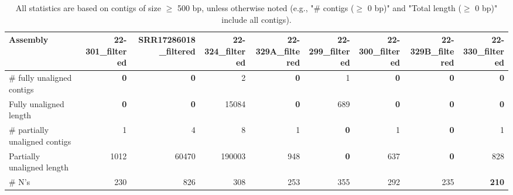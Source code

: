 \documentclass[12pt,a4paper]{article}
\begin{document}
\begin{table}[ht]
\begin{center}
\caption{All statistics are based on contigs of size $\geq$ 500 bp, unless otherwise noted (e.g., "\# contigs ($\geq$ 0 bp)" and "Total length ($\geq$ 0 bp)" include all contigs).}
\begin{tabular}{|l*{8}{|r}|}
\hline
Assembly & 22-301\_filtered & SRR17286018\_filtered & 22-324\_filtered & 22-329A\_filtered & 22-299\_filtered & 22-300\_filtered & 22-329B\_filtered & 22-330\_filtered \\ \hline
\# fully unaligned contigs & {\bf 0} & {\bf 0} & 2 & {\bf 0} & 1 & {\bf 0} & {\bf 0} & {\bf 0} \\ \hline
Fully unaligned length & {\bf 0} & {\bf 0} & 15084 & {\bf 0} & 689 & {\bf 0} & {\bf 0} & {\bf 0} \\ \hline
\# partially unaligned contigs & 1 & 4 & 8 & 1 & {\bf 0} & 1 & {\bf 0} & 1 \\ \hline
Partially unaligned length & 1012 & 60470 & 190003 & 948 & {\bf 0} & 637 & {\bf 0} & 828 \\ \hline
\# N's & 230 & 826 & 308 & 253 & 355 & 292 & 235 & {\bf 210} \\ \hline
\end{tabular}
\end{center}
\end{table}
\end{document}
